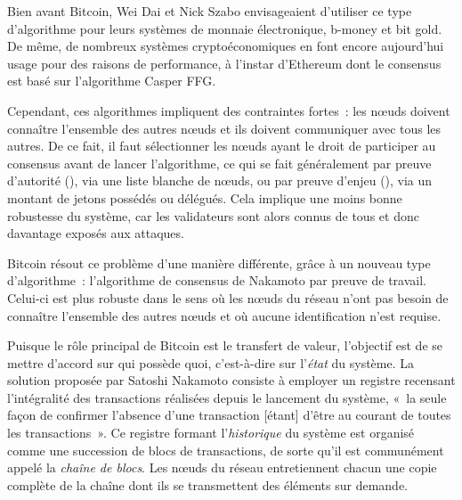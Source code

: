 Bien avant Bitcoin, Wei Dai et Nick Szabo envisageaient d'utiliser ce type d'algorithme pour leurs systèmes de monnaie électronique, b-money et bit gold. De même, de nombreux systèmes cryptoéconomiques en font encore aujourd'hui usage pour des raisons de performance, à l'instar d'Ethereum dont le consensus est basé sur l'algorithme Casper FFG. %

Cependant, ces algorithmes impliquent des contraintes fortes~: les nœuds doivent connaître l'ensemble des autres nœuds et ils doivent communiquer avec tous les autres. De ce fait, il faut sélectionner les nœuds ayant le droit de participer au consensus avant de lancer l'algorithme, ce qui se fait généralement par preuve d'autorité (), via une liste blanche de nœuds, ou par preuve d'enjeu (), via un montant de jetons possédés ou délégués. Cela implique une moins bonne robustesse du système, car les validateurs sont alors connus de tous et donc davantage exposés aux attaques.



Bitcoin résout ce problème d'une manière différente, grâce à un nouveau type d'algorithme~: l'algorithme de consensus de Nakamoto par preuve de travail. Celui-ci est plus robuste dans le sens où les nœuds du réseau n'ont pas besoin de connaître l'ensemble des autres nœuds et où aucune identification n'est requise.

Puisque le rôle principal de Bitcoin est le transfert de valeur, l'objectif est de se mettre d'accord sur qui possède quoi, c'est-à-dire sur l'\emph{état} du système. La solution proposée par Satoshi Nakamoto consiste à employer un registre recensant l'intégralité des transactions réalisées depuis le lancement du système, «~la seule façon de confirmer l'absence d'une transaction [étant] d'être au courant de toutes les transactions~». Ce registre formant l'\emph{historique} du système est organisé comme une succession de blocs de transactions, de sorte qu'il est communément appelé la \emph{chaîne de blocs}. Les nœuds du réseau entretiennent chacun une copie complète de la chaîne dont ils se transmettent des éléments sur demande.

